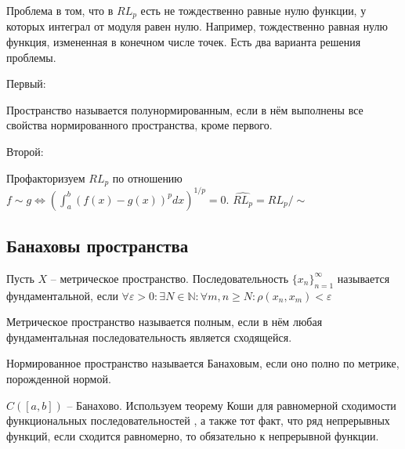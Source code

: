 \documentclass[document.tex]{subfiles}
\begin{document}
\begin{remark}
    Проблема в том, что в $RL_{p}$ есть не тождественно равные нулю функции, у которых интеграл от модуля равен нулю.
    Например, тождественно равная нулю функция, измененная в конечном числе точек. Есть два варианта решения проблемы.
\end{remark}
Первый:
\begin{definition}
    Пространство называется полунормированным, если в нём выполнены все свойства нормированного пространства, кроме
    первого.
\end{definition}
Второй:
\begin{remark}
    Профакторизуем $RL_{p}$ по отношению $f \sim g \Leftrightarrow \left( \int_{a}^{b} (f(x) - g(x))^p dx \right)^{1/p} = 0$. $\hat {RL_{p}} =
    RL_{p}/\sim$
\end{remark}

\subsection{Банаховы пространства}

\begin{definition}
    Пусть $X$ -- метрическое пространство. Последовательность $\{x_n\}_{n = 1}^{\infty}$ называется фундаментальной,
    если $\forall \varepsilon > 0: \exists N \in \mathbb{N}: \forall m, n \geq N: \rho(x_n, x_m) < \varepsilon$
\end{definition}

\begin{definition}
    Метрическое пространство называется полным, если в нём любая фундаментальная последовательность является
    сходящейся.
\end{definition}

\begin{definition}
    Нормированное пространство называется Банаховым, если оно полно по метрике, порожденной нормой.
\end{definition}

\begin{example}
    $C([a, b])$ -- Банахово. Используем теорему Коши для равномерной сходимости функциональных последовательностей
    , а также тот факт, что ряд непрерывных функций, если сходится равномерно, то обязательно к непрерывной функции.
\end{example}
\end{document}
